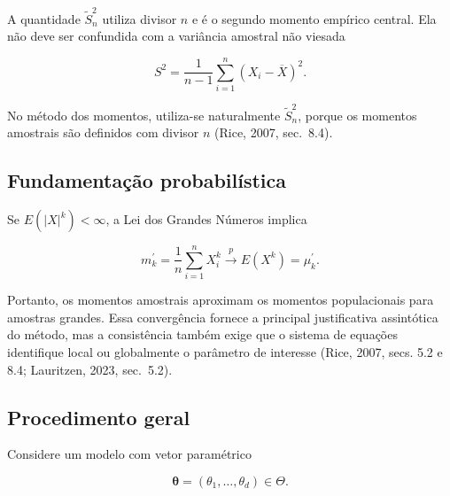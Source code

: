 \documentclass[
  letterpaper,
  DIV=11,
  numbers=noendperiod]{scrreprt}
\begin{document}
\begin{tcolorbox}[enhanced jigsaw, colback=white, leftrule=.75mm, colbacktitle=quarto-callout-warning-color!10!white, breakable, titlerule=0mm, bottomtitle=1mm, title=\textcolor{quarto-callout-warning-color}{\faExclamationTriangle}\hspace{0.5em}{Observação --- duas noções de variância amostral}, colframe=quarto-callout-warning-color-frame, toprule=.15mm, opacityback=0, bottomrule=.15mm, opacitybacktitle=0.6, arc=.35mm, toptitle=1mm, rightrule=.15mm, coltitle=black, left=2mm]

A quantidade \(\widetilde S_n^2\) utiliza divisor \(n\) e é o segundo
momento empírico central. Ela não deve ser confundida com a variância
amostral não viesada

\[S^2=\frac{1}{n-1}\sum_{i=1}^n(X_i-\overline X)^2.\]

No método dos momentos, utiliza-se naturalmente \(\widetilde S_n^2\),
porque os momentos amostrais são definidos com divisor \(n\) (Rice,
2007, sec.~8.4).

\end{tcolorbox}

\subsection*{Fundamentação
probabilística}\label{fundamentauxe7uxe3o-probabiluxedstica}

Se \(E(|X|^k)<\infty\), a Lei dos Grandes Números implica

\[m_k^{\prime}=\frac{1}{n}\sum_{i=1}^nX_i^k\xrightarrow{p}E(X^k)=\mu_k^{\prime}.\]

Portanto, os momentos amostrais aproximam os momentos populacionais para
amostras grandes. Essa convergência fornece a principal justificativa
assintótica do método, mas a consistência também exige que o sistema de
equações identifique local ou globalmente o parâmetro de interesse
(Rice, 2007, secs. 5.2 e 8.4; Lauritzen, 2023, sec.~5.2).

\subsection*{Procedimento geral}\label{procedimento-geral}

Considere um modelo com vetor paramétrico

\[\boldsymbol\theta=(\theta_1,\ldots,\theta_d)\in\Theta.\]
\end{document}
